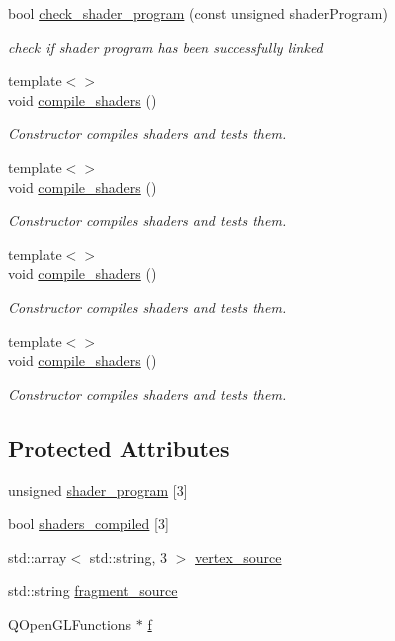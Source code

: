 \begin{DoxyCompactItemize}
bool \mbox{\hyperlink{classShader_aed672a8004b14078f149603eeb1a3f5a}{check\+\_\+shader\+\_\+program}} (const unsigned shader\+Program)
\begin{DoxyCompactList}\small\item\em check if shader program has been successfully linked \end{DoxyCompactList}\item 
{\footnotesize template$<$$>$ }\\void \mbox{\hyperlink{classShader_a3ffd553eceda4e9d5a1d8b4a5a157659}{compile\+\_\+shaders}} ()
\begin{DoxyCompactList}\small\item\em Constructor compiles shaders and tests them. \end{DoxyCompactList}\item 
{\footnotesize template$<$$>$ }\\void \mbox{\hyperlink{classShader_ae486635d367b6054482c56747ed74846}{compile\+\_\+shaders}} ()
\begin{DoxyCompactList}\small\item\em Constructor compiles shaders and tests them. \end{DoxyCompactList}\item 
{\footnotesize template$<$$>$ }\\void \mbox{\hyperlink{classShader_a3ffd553eceda4e9d5a1d8b4a5a157659}{compile\+\_\+shaders}} ()
\begin{DoxyCompactList}\small\item\em Constructor compiles shaders and tests them. \end{DoxyCompactList}\item 
{\footnotesize template$<$$>$ }\\void \mbox{\hyperlink{classShader_ae486635d367b6054482c56747ed74846}{compile\+\_\+shaders}} ()
\begin{DoxyCompactList}\small\item\em Constructor compiles shaders and tests them. \end{DoxyCompactList}\end{DoxyCompactItemize}
\subsection*{Protected Attributes}
\begin{DoxyCompactItemize}
\item 
unsigned \mbox{\hyperlink{classShader_add247d4b8be858eadee1560507ee7118}{shader\+\_\+program}} \mbox{[}3\mbox{]}
\item 
bool \mbox{\hyperlink{classShader_a7093008f0b76639b11867f30ef8d53d8}{shaders\+\_\+compiled}} \mbox{[}3\mbox{]}
\item 
std\+::array$<$ std\+::string, 3 $>$ \mbox{\hyperlink{classShader_a518714107f154f95b3aa613c6db17cb4}{vertex\+\_\+source}}
\item 
std\+::string \mbox{\hyperlink{classShader_afe4fa217dd3f5d201b6a5a4c7fd784be}{fragment\+\_\+source}}
\item 
Q\+Open\+G\+L\+Functions $\ast$ \mbox{\hyperlink{classShader_a49f049def31a2fa9d76c7dad3a9777f3}{f}}
\end{DoxyCompactItemize}



